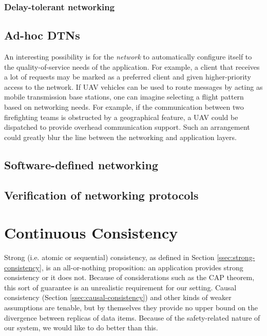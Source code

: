 \documentclass[]             %
{NASA}                       %
\theoremstyle{definition}
\begin{document}
\subsubsection{Delay-tolerant networking}
\label{ssec:delay-tolerant-networking}

\subsection{Ad-hoc DTNs}
\label{ad-hoc-dtns}
An interesting possibility is for the \emph{network} to automatically
configure itself to the quality-of-service needs of the application. For
example, a client that receives a lot of requests may be marked as a
preferred client and given higher-priority access to the network. If UAV
vehicles can be used to route messages by acting as mobile transmission
base stations, one can imagine selecting a flight pattern based on
networking needs. For example, if the communication between two
firefighting teams is obstructed by a geographical feature, a UAV could
be dispatched to provide overhead communication support. Such an
arrangement could greatly blur the line between the networking and
application layers.

\subsection{Software-defined networking}
\label{software-defined-networking}

\subsection{Verification of networking protocols}
\label{verification-of-networking-protocols}

\section{Continuous Consistency}
\label{sec:continuous-consistency}
Strong (i.e. atomic or sequential) consistency, as defined in Section
\ref{ssec:strong-consistency}, is an all-or-nothing proposition: an
application provides strong consistency or it does not. Because of
considerations such as the CAP theorem, this sort of guarantee is an
unrealistic requirement for our setting. Causal consistency (Section
\ref{ssec:causal-consistency}) and other kinds of weaker assumptions
are tenable, but by themselves they provide no upper bound on the
divergence between replicas of data items. Because of the
safety-related nature of our system, we would like to do better than
this.
\end{document}
